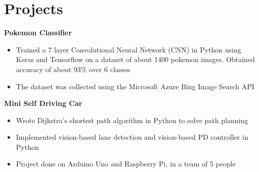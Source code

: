 \documentclass[letterpaper,11pt]{article}
\begin{document}

  


\section{\color{BlueViolet} Projects}
    \small
    \textbf{Pokemon Classifier} 
    \vspace{-4pt}
        \begin{itemize}
            \item Trained a 7 layer Convolutional Neural Network (CNN) in Python using Keras and Tensorflow on a dataset of about 1400 pokemon images. Obtained accuracy of about 93\% over 6 classes
            \vspace{-5pt}
            \item The dataset was collected using the Microsoft Azure Bing Image Search API
        \end{itemize}
    \vspace{-2pt}
    
    \textbf{Mini Self Driving Car} 
    \vspace{-4pt}
        \begin{itemize}
            \item Wrote Dijkstra's shortest path algorithm in Python to solve path planning
            \vspace{-5pt}
            \item Implemented vision-based lane detection and vision-based PD controller in Python
            \vspace{-5pt}
            \item Project done on Arduino Uno and Raspberry Pi, in a team of 5 people
        \end{itemize}
    \vspace{-2pt}
    
\end{document}

